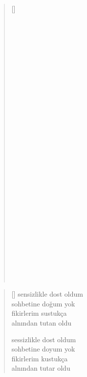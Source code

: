 \documentclass[10pt, openright, twoside]{memoir}
\theoremstyle{definition}
\begin{document}
\vspace*{\fill}
%
\newpage
{}
\vspace*{\fill}
\begin{verse}[\versewidth]
  \phantom{}\\
  \phantom{}\\
  \phantom{}\\
  \phantom{}\\
  \phantom{}\\
  \phantom{}\\
  \phantom{}\\
  \phantom{}\\
  \phantom{}\\
  \phantom{}\\
  \phantom{}\\
  \phantom{}\\
  \phantom{}\\
  \phantom{}\\
  \phantom{}\\
  \phantom{}\\
  \phantom{}\\
  \phantom{}\\
  \phantom{}\\
  \phantom{}\\
  \phantom{}\\
  \phantom{}\\
  \phantom{}\\
  \phantom{}\\
  \phantom{}\\
  \phantom{}\\
  \phantom{}\\
  \phantom{}\\
  \phantom{}\\
\end{verse}
\vspace*{\fill}
%
\newpage
{}
\vspace*{\fill}
\settowidth{\versewidth}{sensizlikle dost oldum}
\begin{verse}[\versewidth]
  sensizlikle dost oldum \\
  sohbetine doğum yok \\
  fikirlerim sustukça \\
  alnından tutan oldu

  sessizlikle dost oldum \\
  sohbetine doyum yok \\
  fikirlerim kustukça \\
  alnından tutar oldu
\end{verse}
\end{document}
